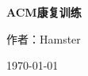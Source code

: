 \documentclass{article}
\begin{document}
\begin{titlepage}
    \centering %

    \vspace*{\fill} %

    {\Huge\bfseries ACM康复训练\par}
    \vspace{1cm}
    {\Large 作者：Hamster\par}
    {\Large \today \par}

    \vspace*{\fill} %


\end{titlepage}

\newpage
\end{document}
